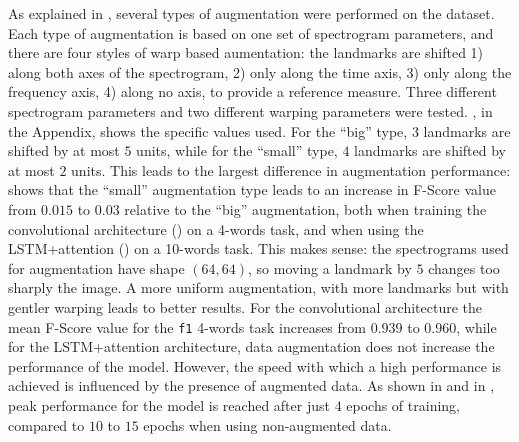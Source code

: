 As explained in , several types of augmentation
were performed on the dataset.
Each type of augmentation is based on one set of spectrogram parameters,
and there are four styles of warp based aumentation:
the landmarks are shifted
1) along both axes of the spectrogram,
2) only along the time axis,
3) only along the frequency axis,
4) along no axis, to provide a reference measure.
Three different spectrogram parameters and two different warping parameters
were tested.
, in the Appendix, shows the specific values used.
For the ``big'' type, $3$ landmarks are shifted by at most $5$ units,
while for the ``small'' type, $4$ landmarks are shifted by at most $2$ units.
This leads to the largest difference in augmentation performance:
 shows that the ``small'' augmentation
type leads to an increase in F-Score value from $0.015$ to $0.03$ relative to
the ``big'' augmentation, both when training the convolutional architecture
() on a 4-words task, and when using the
LSTM+attention () on a 10-words task.
This makes sense: the spectrograms used for augmentation have shape $(64, 64)$,
so moving a landmark by $5$ changes too sharply the image.
A more uniform augmentation, with more landmarks but with 
gentler
warping leads to better results.
For the convolutional architecture the mean F-Score value for the 
\texttt{f1} 4-words task increases from $0.939$ to $0.960$,
while for the LSTM+attention architecture, data augmentation does not increase
the performance of the model.
However, the speed with which a high performance is achieved is influenced
by the presence of augmented data.
As shown in  and in
, 
peak performance for the model is reached after just $4$ epochs of training,
compared to $10$ to $15$ epochs when using non-augmented data.

